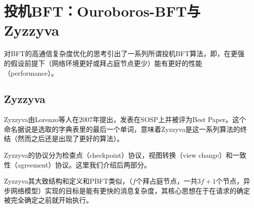 \section{投机BFT：Ouroboros-BFT与Zyzzyva}
对BFT的高通信复杂度优化的思考引出了一系列所谓投机BFT算法，即，在更强的假设前提下（网络环境更好或拜占庭节点更少）能有更好的性能（performance）。
\subsection{Zyzzyva}
Zyzzyva\cite{kotla2007zyzzyva}由Lorenzo等人在2007年提出，发表在SOSP上并被评为Best Paper。这个命名据说是选取的字典表里的最后一个单词，意味着Zyzzyva是这一系列算法的终结（然而之后还是出现了更好的算法）。

Zyzzyva的协议分为检查点（checkpoint）协议，视图转换（view change）和一致性（agreement）协议。这里我们介绍后两部分。

Zyzzyva其大致结构和定义和PBFT类似，（$f$个拜占庭节点，一共$3f+1$个节点，异步网络模型）实现的目标是能有更快的消息复杂度，其核心思想在于在请求的确定被完全确定之前就开始执行。
